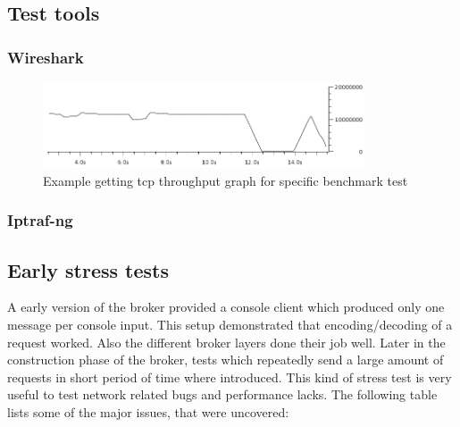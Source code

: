 \subsection{Test tools}
\subsubsection{Wireshark}

\begin{figure}[H]
    \centering
    \includegraphics[width=0.85\textwidth]{images/benchmark/bench-1000-1-eth.png}
    \caption{Example getting tcp throughput graph for specific benchmark test}
\end{figure}

\subsubsection{Iptraf-ng}

\subsection{Early stress tests}
A early version of the broker provided a console client which produced only one
message per console input. This setup demonstrated that encoding/decoding of a
request worked. Also the different broker layers done their job well.
Later in the construction phase of the broker, tests which repeatedly send
a large amount of requests in short period of time where introduced. This kind
of stress test is very useful to test network related bugs and performance
lacks. The following table lists some of the major issues, that were uncovered: 

